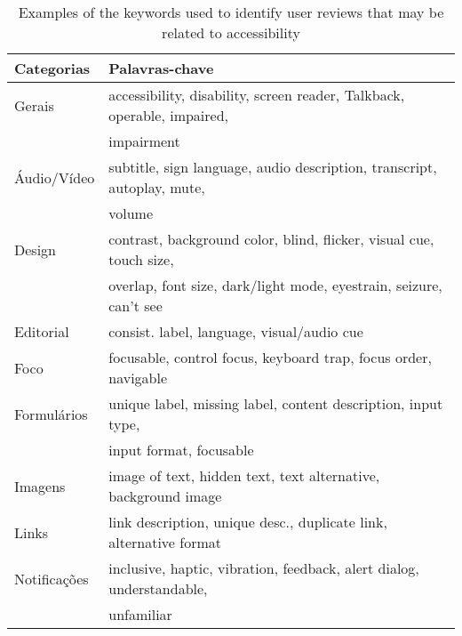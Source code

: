 \begin{table}[!htb]
\small
\caption{Examples of the keywords used to identify user reviews that may be related to accessibility}
\label{tab:keywords}
\begin{tabular}{|l|l|}
\hline
Categorias & Palavras-chave \\
\hline
Gerais                    & accessibility, disability, screen reader, Talkback, operable, impaired, 
\\& impairment                                               \\

\hline
Áudio/Vídeo             & subtitle, sign language, audio description,
 transcript, autoplay, mute, \\& volume                                                 \\

\hline
Design                      & contrast, background color, blind, flicker,
 visual cue, touch size, \\&overlap, font size, 
 dark/light mode, eyestrain, seizure, can't see \\

\hline
Editorial                   & consist. label, language, visual/audio cue                                                                \\

\hline
Foco                       & focusable, control focus, keyboard trap, 
 focus order, navigable                        \\

\hline
Formulários                       & unique label, missing label, content description,
 input type, \\& input format, focusable                                                                        \\

\hline
Imagens                      & image of text, hidden text, text alternative,
background image                                                                                               \\

\hline
Links                       & link description, unique desc., duplicate
link, alternative format \\

\hline
Notificações               & inclusive, haptic, vibration, feedback, alert 
 dialog, understandable, \\& unfamiliar                                                                             \\


\end{tabular}
\end{table}
